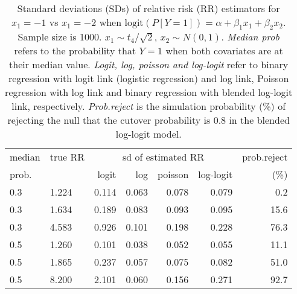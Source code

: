 \documentclass[12pt,a4paper]{article}
\begin{document}
\begin{table}[H] 
\small\sf\centering 
\caption{Standard deviations (SDs) of relative risk (RR) estimators for $x_1=-1$ vs $x_1=-2$ when $\mbox{logit}(P[Y=1])=\alpha+\beta_1 x_1 + \beta_2 x_2$. Sample size is 1000. $x_1 \sim $$t_4/\sqrt{2}$, $x_2 \sim N(0,1)$. {\it Median prob} refers to the probability that $Y=1$ when both covariates are at their median value. {\it Logit, log, poisson and log-logit} refer to binary regression with logit link (logistic regression) and log link, Poisson regression with log link and binary regression with blended log-logit link, respectively. {\it Prob.reject} is the simulation probability (\%) of rejecting the null that the cutover probability is $0.8$ in the blended log-logit model.} 
\begin{tabular}{llrrrrr} 
\toprule 
median & true RR & \multicolumn{4}{c}{sd of estimated RR} & prob.reject \\ 
prob. & & logit & log & poisson & log-logit  & (\%) \\ \midrule 
0.3 & 1.224 & 0.114 & 0.063 & 0.078 & 0.079 &  0.2 \\  
0.3 & 1.634 & 0.189 & 0.083 & 0.093 & 0.095 & 15.6 \\  
0.3 & 4.583 & 0.926 & 0.101 & 0.198 & 0.228 & 76.3 \\  
0.5 & 1.260 & 0.101 & 0.038 & 0.052 & 0.055 & 11.1 \\  
0.5 & 1.865 & 0.237 & 0.057 & 0.075 & 0.082 & 51.0 \\  
0.5 & 8.200 & 2.101 & 0.060 & 0.156 & 0.271 & 92.7 \\  
\bottomrule 
\end{tabular} 
\end{table} 
\end{document}
